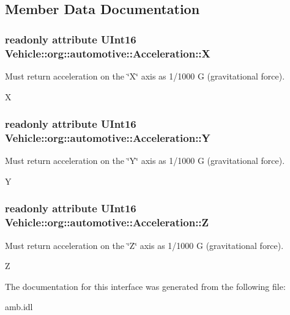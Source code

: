 \subsection{Member Data Documentation}
\hypertarget{interfaceVehicle_1_1org_1_1automotive_1_1Acceleration_a8a388939c29b8612c7dba0379eeaca59}{
\subsubsection[{X}]{\setlength{\rightskip}{0pt plus 5cm}readonly attribute U\-Int16 Vehicle\-::org\-::automotive\-::\-Acceleration\-::\-X}}\label{interfaceVehicle_1_1org_1_1automotive_1_1Acceleration_a8a388939c29b8612c7dba0379eeaca59}


Must return acceleration on the \char`\"{}\-X\char`\"{} axis as 1/1000 G (gravitational force). 

X \hypertarget{interfaceVehicle_1_1org_1_1automotive_1_1Acceleration_aa38385d0e80ba43c508b5ee65a600446}{
\subsubsection[{Y}]{\setlength{\rightskip}{0pt plus 5cm}readonly attribute U\-Int16 Vehicle\-::org\-::automotive\-::\-Acceleration\-::\-Y}}\label{interfaceVehicle_1_1org_1_1automotive_1_1Acceleration_aa38385d0e80ba43c508b5ee65a600446}


Must return acceleration on the \char`\"{}\-Y\char`\"{} axis as 1/1000 G (gravitational force). 

Y \hypertarget{interfaceVehicle_1_1org_1_1automotive_1_1Acceleration_ac3502229bcb8cfca46f17b762fc3bdeb}{
\subsubsection[{Z}]{\setlength{\rightskip}{0pt plus 5cm}readonly attribute U\-Int16 Vehicle\-::org\-::automotive\-::\-Acceleration\-::\-Z}}\label{interfaceVehicle_1_1org_1_1automotive_1_1Acceleration_ac3502229bcb8cfca46f17b762fc3bdeb}


Must return acceleration on the \char`\"{}\-Z\char`\"{} axis as 1/1000 G (gravitational force). 

Z 

The documentation for this interface was generated from the following file\-:\begin{DoxyCompactItemize}
\item 
amb.\-idl\end{DoxyCompactItemize}
